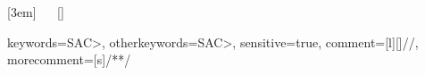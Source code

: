 [3em]
{\normalsize}
{\thecontentslabel\quad}
{\hspace*{0em}}
{\ \dotfill \ \contentspage}
[\vspace{-0.3em}]

\usepackage{multicol}
\makeatletter
\renewcommand{\tableofcontents}{%
\setlength{\columnsep}{2.5em}
\begin{multicols}{2}[\chapter*{\contentsname}]%
    \@starttoc{toc}%
\end{multicols}}
\makeatother

\usepackage{titleps}

\makeatletter	%
\def\cleardoublepage{
    \clearpage
    \if@twoside
        \ifodd
            \c@page
        \else
            \hbox{}
            \vspace*{\fill}
            \begin{center}
		    保护环境，从阅读电子文档开始！
            \end{center}
            \vspace{\fill}
            \thispagestyle{empty}
            \newpage
            \if@twocolumn
                \hbox{}
                \newpage
            \fi
        \fi
    \fi
}
\makeatother

\usepackage[perpage]{footmisc}	%

\usepackage[CJKbookmarks=true,colorlinks,linkcolor=blue, citecolor=blue]{hyperref}

\usepackage{listings}
\usepackage[usenames,dvipsnames,svgnames]{xcolor} %
 {
    keywords={SAC>},   %
    otherkeywords={SAC>},   %
    sensitive=true,
    comment=[l][{\color[rgb]{0,0.4,0}}]{//},
    morecomment=[s]{/*}{*/}
}


